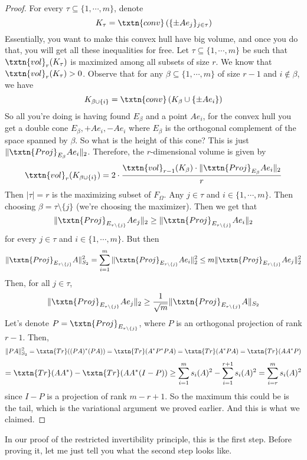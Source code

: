\begin{proof}
For every $\tau \subseteq \{1, \cdots, m\}$, denote
\[
K_{\tau} = \txtn{conv}\left(\{\pm Ae_j\}_{j \in \tau}\right)
\]
Essentially, you want to make this convex hull have big volume, and once you do that, you will get all these inequalities for free. Let $\tau \subseteq \{1, \cdots, m\}$ be such that $\txtn{vol}_r(K_{\tau})$ is maximized among all subsets of size $r$. We know that $\txtn{vol}_r(K_{\tau}) > 0$. Observe that for any $\beta \subseteq \{1, \cdots, m\}$ of size $r - 1$ and $i \not\in \beta$, we have 
\[
K_{\beta \cup \{i\}} = \txtn{conv}\left(K_{\beta} \cup \{\pm Ae_i \}\right)
\]
So all you're doing is having found $E_{\beta}$ and a point $Ae_i$, for the convex hull you get a double cone $E_{\beta}, +Ae_i, -Ae_i$ where $E_{\beta}$ is the orthogonal complement of the space spanned by $\beta$. So what is the height of this cone? This is just $\|\txtn{Proj}_{E_{\beta}} Ae_i\|_2$. Therefore, the $r$-dimensional volume is given by 
\[
\txtn{vol}_r(K_{\beta \cup \{i\}}) = 2\cdot \frac{\txtn{vol}_{r -1}(K_{\beta}) \cdot \|\txtn{Proj}_{E_{\beta}} Ae_i\|_2}{r}
\]
Then $|\tau| = r$ is the maximizing subset of $F_{\Omega}$. Any $j \in \tau$ and $i \in \{1, \cdots, m\}$. Then choosing $\beta = \tau \setminus \{j\}$ (we're choosing the maximizer).  Then we get that 
\[
\|\txtn{Proj}_{E_{\tau \setminus \{j\}}} Ae_j\|_2 \geq \|\txtn{Proj}_{E_{\tau \setminus \{j\}}} Ae_i\|_2
\]
for every $j \in \tau$ and $i \in \{1, \cdots, m\}$. 
But then
\[
\|\txtn{Proj}_{E_{\tau \setminus \{j\}}} A\|_{S_2}^2 = \sum_{i = 1}^m \|\txtn{Proj}_{E_{\tau \setminus \{j\}}} Ae_i\|_2^2 \leq m\|\txtn{Proj}_{E_{\tau \setminus \{j\}}} Ae_j\|_2^2
\]
Then, for all $j \in \tau$, 
\[
\|\txtn{Proj}_{E_{\tau \setminus \{j\}}} Ae_j\|_2 \geq \frac{1}{\sqrt{m}}\|\txtn{Proj}_{E_{\tau \setminus \{j\}}} A\|_{S_2}
\]
Let's denote $P = \txtn{Proj}_{E_{\tau \setminus \{j\}}}$, where $P$ is an orthogonal projection of rank $r - 1$. Then, 
\[
\|PA\|_{S_2}^2 = \txtn{Tr}((PA)^*(PA)) = \txtn{Tr}(A^*P^*PA) = \txtn{Tr}(A^*PA) = \txtn{Tr}(AA^*P)
\]
\[
= \txtn{Tr}(AA^*) - \txtn{Tr}(AA^*(I - P)) \geq \sum_{i = 1}^m s_i(A)^2 - \sum_{i = 1}^{r + 1} s_i(A)^2 = \sum_{i = r}^m s_i(A)^2
\]
since $I - P$ is a projection of rank $m - r + 1$. So the maximum this could be is the tail, which is the variational argument we proved earlier. 
And this is what we claimed. 
\end{proof}

In our proof of the restricted invertibility principle, this is the first step. Before proving it, let me just tell you what the second step looks like. 


